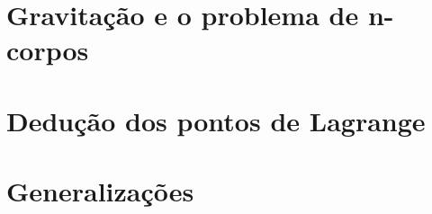 \section{Gravitação e o problema de n-corpos}



\section{Dedução dos pontos de Lagrange}


\section{Generalizações}
